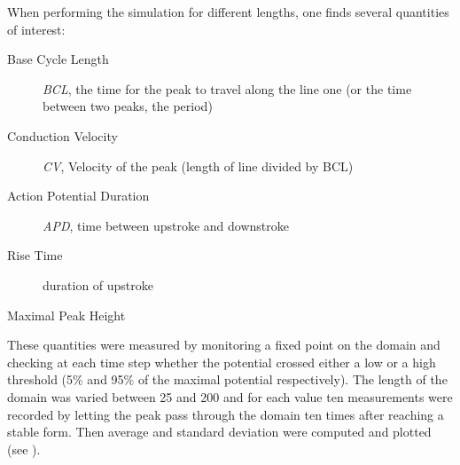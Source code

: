 When performing the simulation for different lengths, one finds several
quantities of interest:
\begin{description}
    \item[Base Cycle Length] \emph{BCL}, the time for the peak to travel along
        the line one (or the time between two peaks, the period)
    \item[Conduction Velocity] \emph{CV}, Velocity of the peak (length of line
        divided by BCL)
    \item[Action Potential Duration] \emph{APD}, time between upstroke and
        downstroke
    \item[Rise Time] duration of upstroke
    \item[Maximal Peak Height]
\end{description}

These quantities were measured by monitoring a fixed point on the domain and
checking at each time step whether the potential crossed either a low or a high
threshold (5\% and 95\% of the maximal potential respectively).
The length of the domain was varied between 25 and 200 and for each value ten
measurements were recorded by letting the peak pass through the domain ten times after
reaching a stable form. Then average and standard deviation were computed and
plotted (see ).

